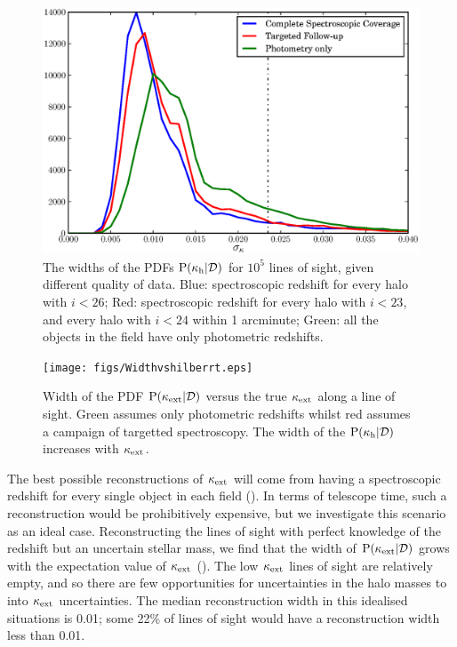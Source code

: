 \documentclass[useAMS,usenatbib,a4paper]{mn2e}
\begin{document}
\begin{figure}
\includegraphics[width=\columnwidth]{figs/Width.eps}
\caption{The widths of the \infered PDFs ${\rm P}(\kappa_{\rm h}|{\mathcal{D}})$ for
$10^5$ lines of sight, given different quality of data. Blue:
spectroscopic redshift for every halo with $i<26$; Red: 
spectroscopic redshift for every halo with $i<23$, and every halo with $i<24$
within 1 arcminute;
Green: all the objects in the field have only photometric redshifts.}
\label{fig:reconwidths}
\end{figure}

\begin{figure}
\texttt{[image: figs/Widthvshilberrt.eps]}
\caption{Width of the \infered PDF ${\rm P}(\kappa_{\rm ext}|{\mathcal{D}})$ versus the true
$\kappa_{\rm ext}$ along a line of sight. Green assumes only photometric redshifts
whilst red assumes a campaign of targetted spectroscopy. The width of the
\infered ${\rm P}(\kappa_{\rm h}|{\mathcal{D}})$ increases with $\kappa_{\rm ext}$.}

\label{fig:widthsvsH}
\end{figure}

The best possible reconstructions of $\kappa_{\rm ext}$ will come from having a
spectroscopic redshift for every single object in each field
().  In terms of telescope time, such a reconstruction
would be prohibitively expensive, but we investigate this scenario as an ideal
case. Reconstructing the lines of sight with perfect knowledge of the redshift
but an uncertain stellar mass, we find that the width of ${\rm P}(\kappa_{\rm ext}|{\mathcal{D}})$
grows with the expectation value of $\kappa_{\rm ext}$ (). The low
$\kappa_{\rm ext}$ lines of sight are relatively empty, and so there are few
opportunities for uncertainties in the halo masses to \propogate into $\kappa_{\rm ext}$
uncertainties. The median reconstruction width in this idealised situations is
0.01; some 22\% of lines of sight would have a reconstruction width less
than 0.01. 
\end{document}
